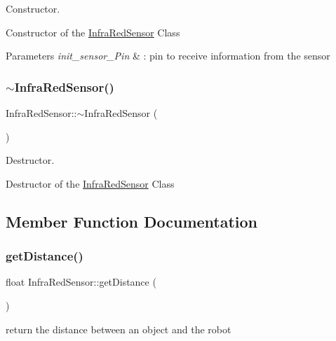 Constructor. 

Constructor of the \hyperlink{class_infra_red_sensor}{Infra\+Red\+Sensor} Class\textquotesingle{}


\begin{DoxyParams}{Parameters}
{\em init\+\_\+sensor\+\_\+\+Pin} & \+: pin to receive information from the sensor \\
\hline
\end{DoxyParams}
\mbox{\label{class_infra_red_sensor_a0444b90b3740fe361388907ee7f9930f}} 
\subsubsection{\texorpdfstring{$\sim$\+Infra\+Red\+Sensor()}{~InfraRedSensor()}}
{\footnotesize\ttfamily Infra\+Red\+Sensor\+::$\sim$\+Infra\+Red\+Sensor (\begin{DoxyParamCaption}{ }\end{DoxyParamCaption})}



Destructor. 

Destructor of the \hyperlink{class_infra_red_sensor}{Infra\+Red\+Sensor} Class\textquotesingle{} 

\subsection{Member Function Documentation}
\mbox{\label{class_infra_red_sensor_a60ca6c269209278cac5da50e5a4fbc0a}} 
\subsubsection{\texorpdfstring{get\+Distance()}{getDistance()}}
{\footnotesize\ttfamily float Infra\+Red\+Sensor\+::get\+Distance (\begin{DoxyParamCaption}{ }\end{DoxyParamCaption})}



return the distance between an object and the robot 

